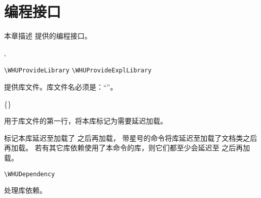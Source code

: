 \documentclass[twoside]{book}
\begin{document}



\chapter{编程接口}

本章描述 \WhuTeX 提供的编程接口。

\begin{function}[module=whu]{\WHUProvideLibrary,\WHUProvideExplLibrary}
\begin{syntax}
  \verb|\WHUProvideLibrary|      
  \verb|\WHUProvideExplLibrary|    
\end{syntax}
提供库文件。库文件名必须是：“”。
\end{function}

\begin{function}[module=whu]{\WHULibraryDelayedUntil}
  \begin{syntax}
    \V\WHULibraryDelayedUntil   {}
    \V\WHULibraryDelayedUntil * \{\}
    \V\WHULibraryDelayedUntil * 
  \end{syntax}
用于库文件的第一行，将本库标记为需要延迟加载。

标记本库延迟至加载了  之后再加载，
带星号的命令将库延迟至加载了文档类之后再加载。
若有其它库依赖使用了本命令的库，则它们都至少会延迟至  之后再加载。
\end{function}

\begin{function}[module=whu]{\WHUDependency}
\begin{syntax}
  \verb|\WHUDependency| 
\end{syntax}
处理库依赖。
\end{function}
\end{document}
